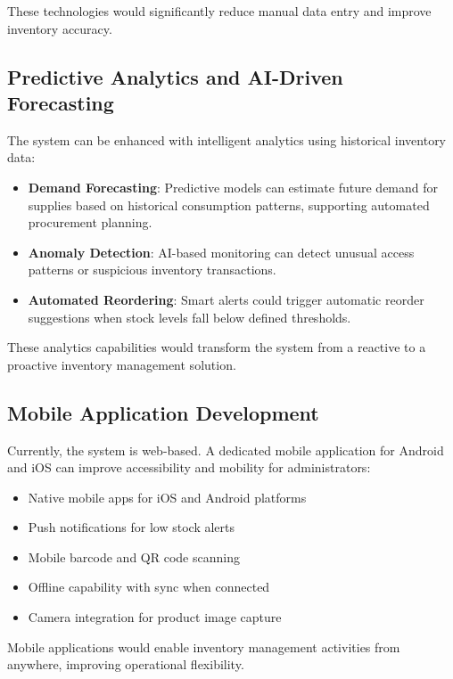 These technologies would significantly reduce manual data entry and improve inventory accuracy.

\subsection{Predictive Analytics and AI-Driven Forecasting}

The system can be enhanced with intelligent analytics using historical inventory data:

\begin{itemize}
    \item \textbf{Demand Forecasting}: Predictive models can estimate future demand for supplies based on historical consumption patterns, supporting automated procurement planning.

    \item \textbf{Anomaly Detection}: AI-based monitoring can detect unusual access patterns or suspicious inventory transactions.

    \item \textbf{Automated Reordering}: Smart alerts could trigger automatic reorder suggestions when stock levels fall below defined thresholds.
\end{itemize}

These analytics capabilities would transform the system from a reactive to a proactive inventory management solution.

\subsection{Mobile Application Development}

Currently, the system is web-based. A dedicated mobile application for Android and iOS can improve accessibility and mobility for administrators:

\begin{itemize}
    \item Native mobile apps for iOS and Android platforms
    \item Push notifications for low stock alerts
    \item Mobile barcode and QR code scanning
    \item Offline capability with sync when connected
    \item Camera integration for product image capture
\end{itemize}

Mobile applications would enable inventory management activities from anywhere, improving operational flexibility.


